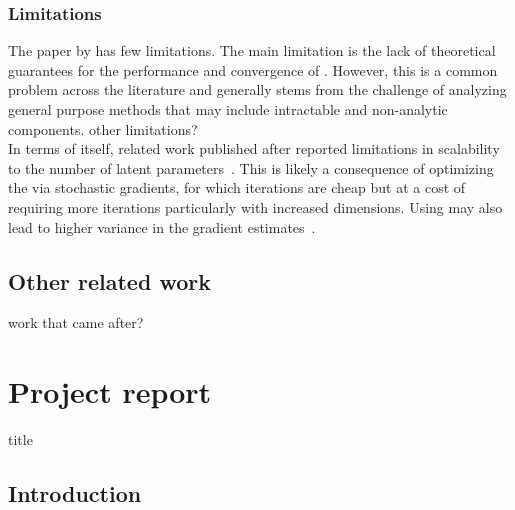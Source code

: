 \documentclass[10pt]{article}
\begin{document}
\subsubsection{Limitations}

The paper by \citet{Titsias:2019} has few limitations. The main limitation is the lack of theoretical guarantees for the performance and convergence of \uivi. However, this is a common problem across the \vi literature and generally stems from the challenge of analyzing general purpose methods that may include intractable and non-analytic components. \todo other limitations?
\\

In terms of \uivi itself, related work published after \uivi reported limitations in scalability to the number of latent parameters~\citep{Molchanova:2019,Moens:2021}. This is likely a consequence of optimizing the \elbo via stochastic gradients, for which iterations are cheap but at a cost of requiring more iterations particularly with increased dimensions. Using \mcmc may also lead to higher variance in the \elbo gradient estimates~\citep{Betancourt:2015}. \todo


\subsection{Other related work}

\todo work that came after?


\newpage


\section{Project report}

\todo title

\vspace{2em}
\begin{abstract}
\todo
\end{abstract}
\vspace{2em}

\subsection{Introduction}


\newpage




\end{document}
